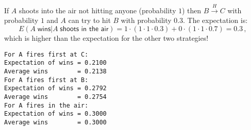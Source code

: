  If $A$ shoots into the air not hitting anyone (probability $1$) then $B\stackrel{H}{\longrightarrow}C$ with probability $1$ and $A$ can try to hit $B$ with probability $0.3$. The expectation is:
\[
E(A \;\textsf{wins}|A\;\textsf{shoots in the air}) = 1\cdot (1\cdot 1 \cdot 0.3) + 0\cdot(1\cdot 1\cdot 0.7)=0.3\,,
\]
which is higher than the expectation for the other two strategies!

\sml{}
\begin{verbatim}
For A fires first at C:
Expectation of wins = 0.2100
Average wins        = 0.2138
For A fires first at B:
Expectation of wins = 0.2792
Average wins        = 0.2754
For A fires in the air:
Expectation of wins = 0.3000
Average wins        = 0.3000
\end{verbatim}

